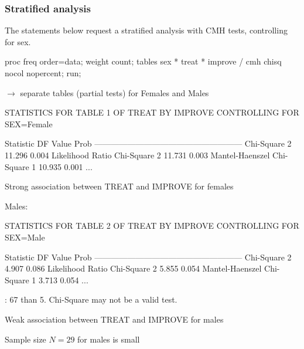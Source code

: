 \begin{frame}[fragile]
  \frametitle{Stratified analysis}
The statements below request a stratified analysis with CMH tests,
controlling for sex.

\begin{Input}[fontsize=\footnotesize,label=\fbox{$\cdots$ \texttt{arthfreq.sas} $\cdots$},baselinestretch=0.8,firstnumber=20]
proc freq order=data;
   weight count;
   tables sex * treat * improve / cmh chisq nocol nopercent;
   run;
\end{Input}
$\rightarrow$ separate tables (partial tests) for Females and Males
\begin{Output}
       STATISTICS FOR TABLE 1 OF TREAT BY IMPROVE
               CONTROLLING FOR SEX=Female

 Statistic                     DF     Value        Prob
 ------------------------------------------------------
 Chi-Square                     2    11.296       0.004
 Likelihood Ratio Chi-Square    2    11.731       0.003
 Mantel-Haenszel Chi-Square     1    10.935       0.001
  ...
\end{Output}
\begin{itemize*}
\item Strong association between TREAT and IMPROVE for females
\end{itemize*}
\end{frame}

\begin{frame}[fragile]
Males:
\begin{Output}
       STATISTICS FOR TABLE 2 OF TREAT BY IMPROVE
                CONTROLLING FOR SEX=Male

 Statistic                     DF     Value        Prob
 ------------------------------------------------------
 Chi-Square                     2     4.907       0.086
 Likelihood Ratio Chi-Square    2     5.855       0.054
 Mantel-Haenszel Chi-Square     1     3.713       0.054
  ...

:  67%
           than 5. Chi-Square may not be a valid test.
\end{Output}
\begin{itemize*}
\item Weak association between TREAT and IMPROVE for males
\item Sample size $N=29$ for males is small
\end{itemize*}

\end{frame}

